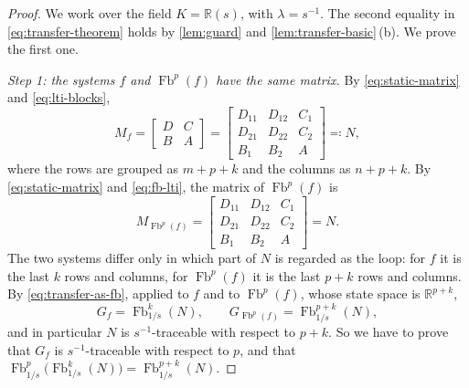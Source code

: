\documentclass[11pt,a4paper]{article}
\theoremstyle{plain}
\theoremstyle{definition}
\theoremstyle{remark}
\DeclareMathOperator{\Fb}{Fb}
\newcommand{\R}{\mathbb{R}}
\newcommand{\Rs}{\mathbb{R}(s)}
\begin{document}
\begin{proof}
    We work over the field $K = \Rs$, with $\lambda = s^{-1}$.
    The second equality in \cref{eq:transfer-theorem} holds by \cref{lem:guard} and \cref{lem:transfer-basic}\,(b).
    We prove the first one.

    \emph{Step 1: the systems $f$ and $\Fb^p(f)$ have the same matrix.}
    By \cref{eq:static-matrix} and \cref{eq:lti-blocks},
    \begin{equation}
        \label{eq:N}
        M_f = \begin{bmatrix} D & C \\ B & A \end{bmatrix}
        = \begin{bmatrix} D_{11} & D_{12} & C_1 \\ D_{21} & D_{22} & C_2 \\ B_1 & B_2 & A \end{bmatrix}
        \eqqcolon N,
    \end{equation}
    where the rows are grouped as $m + p + k$ and the columns as $n + p + k$.
    By \cref{eq:static-matrix} and \cref{eq:fb-lti}, the matrix of $\Fb^p(f)$ is
    \begin{equation*}
        M_{\Fb^p(f)} =
        \left[\begin{array}{c|cc}
                D_{11} & D_{12} & C_1 \\ \hline
                D_{21} & D_{22} & C_2 \\
                B_1    & B_2    & A
            \end{array}\right]
        = N .
    \end{equation*}
    The two systems differ only in which part of $N$ is regarded as the loop: for $f$ it is the last $k$ rows and columns, for $\Fb^p(f)$ it is the last $p + k$ rows and columns.
    By \cref{eq:transfer-as-fb}, applied to $f$ and to $\Fb^p(f)$, whose state space is $\R^{p+k}$,
    \begin{equation}
        \label{eq:two-transfer-functions}
        G_f = \Fb^k_{1/s}(N),
        \qquad
        G_{\Fb^p(f)} = \Fb^{p+k}_{1/s}(N),
    \end{equation}
    and in particular $N$ is $s^{-1}$-traceable with respect to $p + k$.
    So we have to prove that $G_f$ is $s^{-1}$-traceable with respect to $p$, and that $\Fb^p_{1/s}\bigl( \Fb^k_{1/s}(N) \bigr) = \Fb^{p+k}_{1/s}(N)$.


\end{proof}
\end{document}
